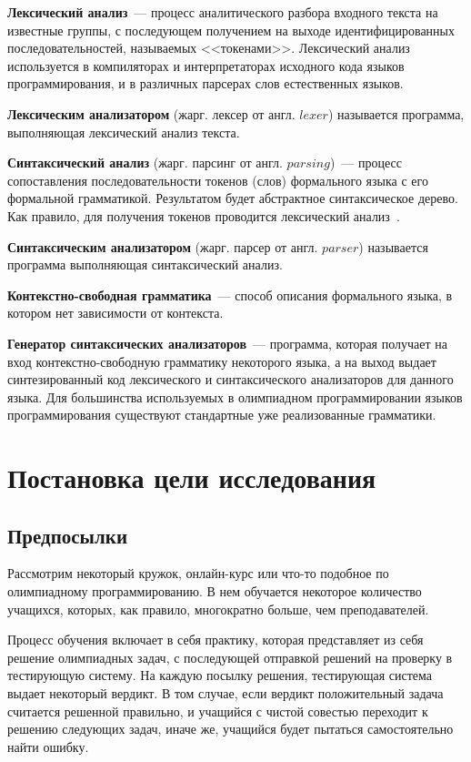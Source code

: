 \textbf{Лексический анализ}~--- процесс аналитического разбора 
входного текста на известные группы, с последующем получением на выходе 
идентифицированных последовательностей, называемых <<токенами>>. 
Лексический анализ используется в компиляторах и интерпретаторах исходного кода языков программирования, 
и в различных парсерах слов естественных языков.

\textbf{Лексическим анализатором} (жарг. лексер от англ. $lexer$) называется программа, выполняющая лексический анализ текста.

\textbf{Синтаксический анализ} (жарг. парсинг от англ. $parsing$)~--- процесс сопоставления последовательности токенов (слов)
формального языка с его формальной грамматикой. Результатом будет абстрактное синтаксическое дерево. Как правило, для получения
токенов проводится лексический анализ~\cite{syntax}.

\textbf{Синтаксическим анализатором} (жарг. парсер от англ. $parser$) называется программа выполняющая синтаксический анализ.

\textbf{Контекстно-свободная грамматика}~---  способ описания формального языка, в котором нет зависимости от контекста.

\textbf{Генератор синтаксических анализаторов}~--- программа, которая получает на вход контекстно-свободную грамматику 
некоторого языка, а на выход выдает синтезированный код лексического и синтаксического анализаторов для данного языка.
Для большинства используемых в олимпиадном программировании языков программирования 
существуют стандартные уже реализованные грамматики.

\section{Постановка цели исследования}
\subsection{Предпосылки}

Рассмотрим некоторый кружок, онлайн-курс или что-то подобное по олимпиадному программированию. 
В нем обучается некоторое количество учащихся, которых, как правило, многократно больше, чем преподавателей.

Процесс обучения включает в себя практику, которая представляет из себя решение олимпиадных задач, с последующей
отправкой решений на проверку в тестирующую систему. На каждую посылку решения, тестирующая система выдает некоторый вердикт.
В том случае, если вердикт положительный задача считается решенной правильно, и учащийся с чистой совестью переходит к решению
следующих задач, иначе же, учащийся будет пытаться самостоятельно найти ошибку.

